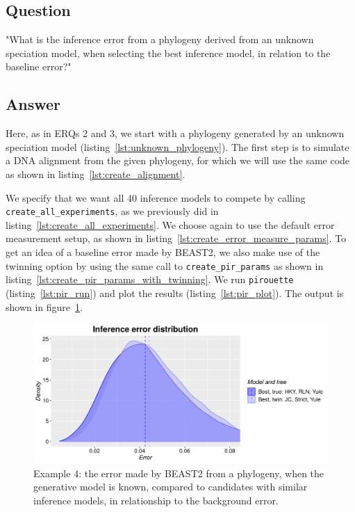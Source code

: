 \documentclass{article}
\begin{document}
\subsection{Question}

"What is the inference error from a phylogeny 
derived from an unknown speciation model,
when selecting the best inference model, 
in relation to the baseline error?"

\subsection{Answer}

Here, as in ERQs 2 and 3, we start with a phylogeny 
generated by an unknown speciation model (listing~\ref{lst:unknown_phylogeny}). 
The first step is to simulate a DNA alignment 
from the given phylogeny, for which we will use the same code 
as shown in listing~\ref{lst:create_alignment}.

We specify that we want all 40 inference models to compete 
by calling \verb;create_all_experiments;,
as we previously did in listing~\ref{lst:create_all_experiments}.
We choose again to use the default error measurement setup,
as shown in listing~\ref{lst:create_error_measure_params}.
To get an idea of a baseline error made by BEAST2, 
we also make use of the twinning option by using
the same call to \verb;create_pir_params; as shown in 
listing~\ref{lst:create_pir_params_with_twinning}.
We run \verb;pirouette; (listing~\ref{lst:pir_run}) 
and plot the results (listing~\ref{lst:pir_plot}).
The output is shown in figure~\ref{fig:example_4}. 

\begin{figure}[H]
  \includegraphics[width=\textwidth]{example_4/errors.png}
  \caption{
    Example 4: the error made by BEAST2 from a phylogeny, when the generative 
    model is known, compared to candidates with similar inference models, in 
    relationship to the background error.
  }
  \label{fig:example_4}
\end{figure}
\end{document}
